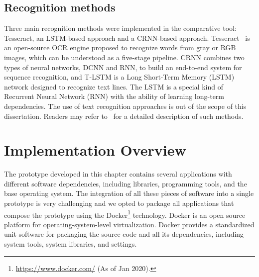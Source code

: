 \subsection{Recognition methods}
Three main recognition methods were implemented in the comparative tool: Tesseract, an LSTM-based approach and a CRNN-based approach. Tesseract~\cite{Smith2007ICDAR} is an open-source OCR engine proposed to recognize words from gray or RGB images, which can be understood as a five-stage pipeline. CRNN combines two types of neural networks, DCNN and RNN, to build an end-to-end system for sequence recognition, and T-LSTM is a Long Short-Term Memory (LSTM) network designed to recognize text lines. The LSTM is a special kind of Recurrent Neural Network (RNN) with the ability of learning long-term dependencies. The use of text recognition approaches is out of the scope of this dissertation. Readers may refer to~\cite{joselito} for a detailed description of such methods. 

\section{Implementation Overview}

The prototype developed in this chapter contains several applications with different software dependencies, including libraries, programming tools, and the base operating system. The integration of all these pieces of software into a single prototype is very challenging and we opted to package all applications that compose the prototype using the Docker\footnote{\url{https://www.docker.com/} (As of Jan 2020).} technology. Docker is an open source platform for operating-system-level virtualization. Docker provides a standardized unit software for packaging the source code and all its dependencies, including system tools, system libraries, and settings.

